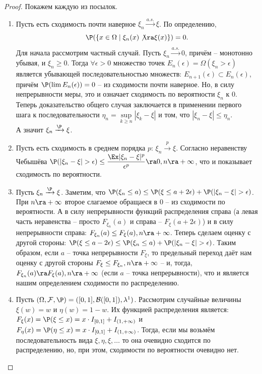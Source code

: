 \begin{proof}
    Покажем каждую из посылок.
    \begin{enumerate}
        \item Пусть есть сходимость почти наверное $\xi_n \xrightarrow{a.s.} \xi$. По определению, \[\P(\{x \in \Omega \mid \xi_n(x) \not\ra \xi(x)\}) = 0.\]
        Для начала рассмотрим частный случай. Пусть $\xi_n \xrightarrow{a.s.} 0$, причём -- монотонно убывая, и $\xi_n \geq 0$. Тогда $\forall \epsilon > 0$ множество точек $E_n(\epsilon) = \Omega(\xi_n > \epsilon)$ является убывающей последовательностью множеств: $E_{n + 1}(\epsilon) \subset E_{n}(\epsilon)$, причём $\P(\lim E_n(\epsilon)) = 0$ -- из сходимости почти наверное. Но, в силу непрерывности меры, это и означает сходимость по вероятности $\xi_n$ к 0.
        Теперь доказательство общего случая заключается в применении первого шага к последовательности $\eta_n = \sup\limits_{k \geq n}|\xi_k - \xi|$ и том, что $|\xi_n - \xi| \leq \eta_n$. \\
        А значит $\xi_n \xrightarrow{\P} \xi$.
        \item Пусть есть сходимость в среднем порядка $p$: $\xi_n \xrightarrow{p} \xi$. Согласно неравенству Чебышёва $\P(|\xi_n - \xi| > \epsilon) \leq \dfrac{\Ex|\xi_n - \xi|^p}{\epsilon^p} \ra 0, n \ra +\infty$, что и показывает сходимость по вероятности.
        \item Пусть $\xi_n \xrightarrow{\P} \xi$. Заметим, что $\P(\xi_n \leq a) \leq \P(\xi \leq a + 2\epsilon) + \P(|\xi_n - \xi| > \epsilon)$.
        При $n \ra +\infty$ второе слагаемое обращаеся в 0 -- из сходимости по вероятности. А в силу непрерывности функций распределения справа (а левая часть неравенства -- просто $F_{\xi_n}(a)$ и справа -- $F_{\xi}(a + 2\epsilon)$) и в силу непрерывности справа: $F_{\xi_n}(a) \leq F_{\xi}(a), n \ra +\infty$.
        Теперь сделаем оценку с другой стороны: $\P(\xi \leq a - 2\epsilon) \leq \P(\xi_n \leq a) + \P(|\xi_n - \xi| > \epsilon)$. Таким образом, если $a$ -- точка непрерывности $F_{\xi}$, то предельный переход даёт нам оценку с другой стороны $F_{\xi} \leq F_{\xi_n}, n \ra +\infty$ -- и, тогда, $F_{\xi_n}(a) \ra F_{\xi}(a), n \ra +\infty$ (если $a$ -- точка непрерывности), что и является нашим определением сходимости по распределению.
        \item Пусть $(\Omega, \mathcal{F}, \P) = ([0, 1], \mathcal{B}([0, 1]), \lambda^1)$. Рассмотрим случайные величины $\xi(w) = w$ и $\eta(w) = 1 - w$. Их функцией распределения является: $F_{\xi}(x) = \P(\xi \leq x) = x \cdot I_{[0, 1]} + I_{(1, +\infty)}$ и $F_{\eta}(x) = \P(\eta \leq x) = x \cdot I_{[0, 1]} + I_{(1, +\infty)}$. Тогда, если мы возьмём последовательность вида $\xi, \eta, \xi, \ldots$ то она очевидно сходится по распределению, но, при этом, сходимости по вероятности очевидно нет.

\end{enumerate}
\end{proof}
